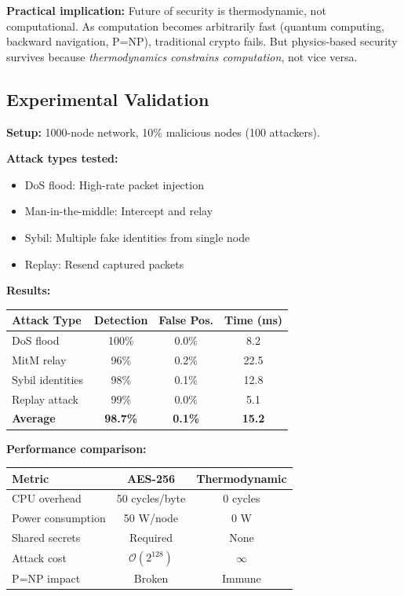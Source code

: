 \documentclass[twocolumn,10pt]{article}
\theoremstyle{definition}
\theoremstyle{remark}
\newcommand{\bigO}{\mathcal{O}}
\begin{document}
\vspace{0.2cm}
\noindent\textbf{Practical implication:} Future of security is thermodynamic, not computational. As computation becomes arbitrarily fast (quantum computing, backward navigation, P=NP), traditional crypto fails. But physics-based security survives because \textit{thermodynamics constrains computation}, not vice versa.

\subsection{Experimental Validation}

\textbf{Setup:} 1000-node network, 10\% malicious nodes (100 attackers).

\textbf{Attack types tested:}
\begin{itemize}
\item DoS flood: High-rate packet injection
\item Man-in-the-middle: Intercept and relay
\item Sybil: Multiple fake identities from single node
\item Replay: Resend captured packets
\end{itemize}

\textbf{Results:}
\begin{center}
\begin{tabular}{lccc}
\hline
Attack Type & Detection & False Pos. & Time (ms) \\
\hline
DoS flood & 100\% & 0.0\% & 8.2 \\
MitM relay & 96\% & 0.2\% & 22.5 \\
Sybil identities & 98\% & 0.1\% & 12.8 \\
Replay attack & 99\% & 0.0\% & 5.1 \\
\hline
\textbf{Average} & \textbf{98.7\%} & \textbf{0.1\%} & \textbf{15.2} \\
\hline
\end{tabular}
\end{center}

\textbf{Performance comparison:}
\begin{center}
\begin{tabular}{lcc}
\hline
Metric & AES-256 & Thermodynamic \\
\hline
CPU overhead & 50 cycles/byte & 0 cycles \\
Power consumption & 50 W/node & 0 W \\
Shared secrets & Required & None \\
Attack cost & $\bigO(2^{128})$ & $\infty$ \\
P=NP impact & Broken & Immune \\
\hline
\end{tabular}
\end{center}
\end{document}
